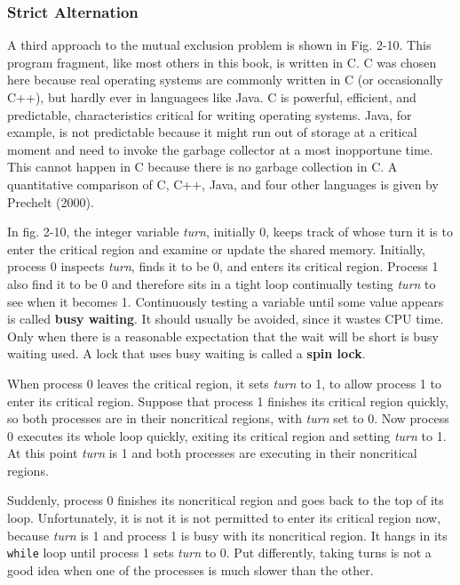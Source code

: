 \documentclass{book}
\newcommand {\kw}  [1] {\textbf{#1}}
\newcommand {\sys} [1] {\textsl{#1}}
\newcommand {\cmd} [1] {\texttt{#1}}
\begin{document}
\subsubsection*{Strict Alternation}
A third approach to the mutual exclusion problem is shown in Fig. 2-10.
This program fragment, like most others in this book, is written in C.
C was chosen here because real operating systems are commonly written in C (or occasionally C++),
but hardly ever in languagees like Java.
C is powerful, efficient, and predictable, characteristics critical for writing operating systems.
Java, for example, is not predictable because it might run out of storage at a critical moment 
and need to invoke the garbage collector at a most inopportune time.
This cannot happen in C because there is no garbage collection in C.
A quantitative comparison of C, C++, Java, and four other languages is given by Prechelt (2000).

In fig. 2-10, the integer variable \sys{turn}, initially 0, keeps track of whose turn it is to enter the critical region
and examine or update the shared memory.
Initially, process 0 inspects \sys{turn}, finds it to be 0, and enters its critical region.
Process 1 also find it to be 0 and therefore sits in a tight loop continually testing \sys{turn} to see when it becomes 1.
Continuously testing a variable until some value appears is called \kw{busy waiting}.
It should usually be avoided, since it wastes CPU time.
Only when there is a reasonable expectation that the wait will be short is busy waiting used.
A lock that uses busy waiting is called a \kw{spin lock}.

When process 0 leaves the critical region, it sets \sys{turn} to 1, to allow process 1 to enter its critical region.
Suppose that process 1 finishes its critical region quickly, so both processes are in their noncritical regions,
with \sys{turn} set to 0.
Now process 0 executes its whole loop quickly, exiting its critical region and setting \sys{turn} to 1.
At this point \sys{turn} is 1 and both processes are executing in their noncritical regions.

Suddenly, process 0 finishes its noncritical region and goes back to the top of its loop.
Unfortunately, it is not it is not permitted to enter its critical region now, 
because \sys{turn} is 1 and process 1 is busy with its noncritical region.
It hangs in its \cmd{while} loop until process 1 sets \sys{turn} to 0.
Put differently, taking turns is not a good idea when one of the processes is much slower than the other.
\end{document}

